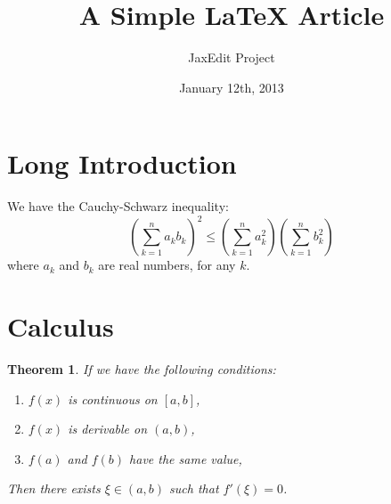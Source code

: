 \documentclass{article}
\newtheorem{thm}{Theorem}
\begin{document}
\title{A Simple LaTeX Article}
\author{JaxEdit Project}
\date{January 12th, 2013}
\maketitle

\tableofcontents

\section[Introduction]{Long Introduction}

We have the Cauchy-Schwarz inequality:
  \[ \left( \sum_{k=1}^n a_k b_k \right)^2 \leq \left( \sum_{k=1}^n a_k^2 \right) \left( \sum_{k=1}^n b_k^2 \right) \]
where $a_k$ and $b_k$ are real numbers, for any $k$.

\section{Calculus}

\begin{thm}
If we have the following conditions:
\begin{enumerate}
\item $f(x)$ is continuous on $[a,b]$,
\item $f(x)$ is derivable on $(a,b)$,
\item $f(a)$ and $f(b)$ have the same value,
\end{enumerate}
Then there exists $\xi\in(a,b)$ such that $f'(\xi)=0$.
\end{thm}
\end{document}
